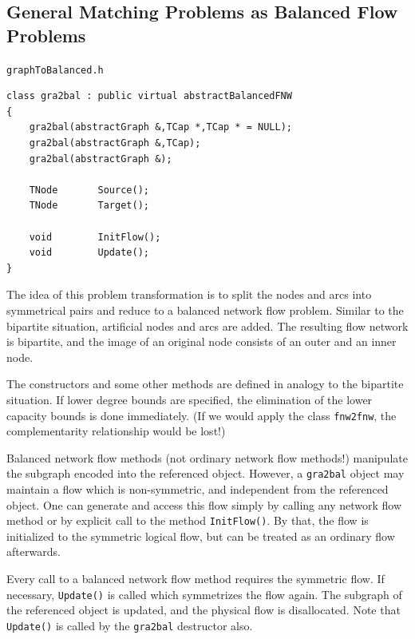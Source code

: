\documentclass[a4paper,11pt,twoside]{book}
\begin{document}
\begin{multicols}{2}
\subsection{General Matching Problems as Balanced Flow Problems}
\label{slb233}
\myinclude\verb/graphToBalanced.h/
\begin{mymethods}
\begin{verbatim}
class gra2bal : public virtual abstractBalancedFNW
{
    gra2bal(abstractGraph &,TCap *,TCap * = NULL);
    gra2bal(abstractGraph &,TCap);
    gra2bal(abstractGraph &);

    TNode       Source();
    TNode       Target();

    void        InitFlow();
    void        Update();
}
\end{verbatim}
\end{mymethods}
The idea of this problem transformation is to split the nodes and arcs into
symmetrical pairs and reduce to a balanced network flow problem. Similar
to the bipartite situation, artificial nodes and arcs are added. The resulting
flow network is bipartite, and the image of an original node consists of an
outer and an inner node.

The constructors and some other methods are defined in analogy to the bipartite
situation. If lower degree bounds are specified, the elimination of the lower
capacity bounds is done immediately. (If we would apply the class
\verb/fnw2fnw/, the complementarity relationship would be lost!)

Balanced network flow methods (not ordinary network flow methods!) manipulate
the subgraph encoded into the referenced object. However, a \verb/gra2bal/
object may maintain a flow which is non-symmetric, and independent from the
referenced object. One can generate and access this flow simply by calling any
network flow method or by explicit call to the method \verb/InitFlow()/.
By that, the flow is initialized to the symmetric logical flow, but can be
treated as an ordinary flow afterwards.

Every call to a balanced network flow method requires the symmetric flow.
If necessary, \verb/Update()/ is called which symmetrizes the flow again.
The subgraph of the referenced object is updated, and the physical flow is
disallocated. Note that \verb/Update()/ is called by the \verb/gra2bal/
destructor also.


\end{multicols}
\end{document}
